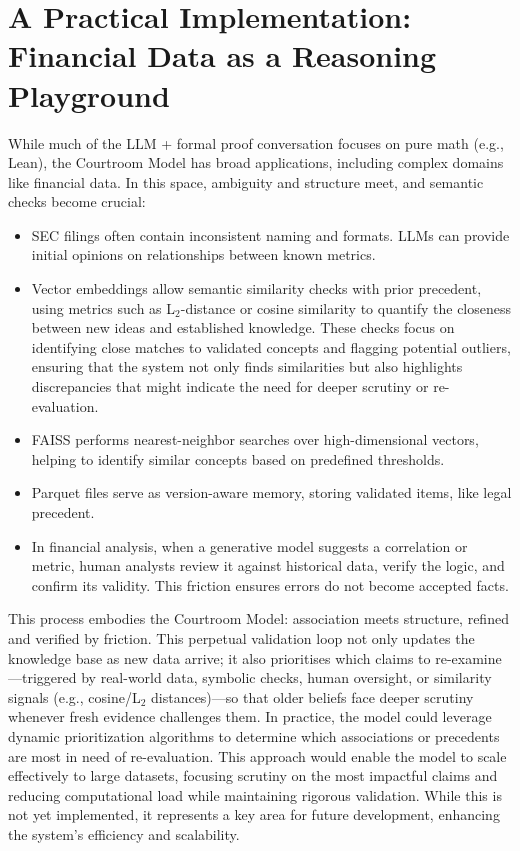 \documentclass[11pt]{article}
\begin{document}
\section{A Practical Implementation: Financial Data as a Reasoning Playground}
While much of the LLM + formal proof conversation focuses on pure math (e.g., Lean), the Courtroom Model has broad applications, including complex domains like financial data. In this space, ambiguity and structure meet, and semantic checks become crucial:
\begin{itemize}
    \item SEC filings often contain inconsistent naming and formats. LLMs can provide initial opinions on relationships between known metrics.
    \item Vector embeddings allow semantic similarity checks with prior precedent, using metrics such as L$_2$-distance or cosine similarity to quantify the closeness between new ideas and established knowledge. These checks focus on identifying close matches to validated concepts and flagging potential outliers, ensuring that the system not only finds similarities but also highlights discrepancies that might indicate the need for deeper scrutiny or re-evaluation.
    \item FAISS performs nearest-neighbor searches over high-dimensional vectors, helping to identify similar concepts based on predefined thresholds.
    \item Parquet files serve as version-aware memory, storing validated items, like legal precedent.
    \item In financial analysis, when a generative model suggests a correlation or metric, human analysts review it against historical data, verify the logic, and confirm its validity. This friction ensures errors do not become accepted facts.
\end{itemize}
This process embodies the Courtroom Model: association meets structure, refined and verified by friction. This perpetual validation loop not only updates the knowledge base as new data arrive; it also prioritises which claims to re-examine—triggered by real-world data, symbolic checks, human oversight, or similarity signals (e.g., cosine/L$_2$ distances)—so that older beliefs face deeper scrutiny whenever fresh evidence challenges them.
In practice, the model could leverage dynamic prioritization algorithms to determine which associations or precedents are most in need of re-evaluation. This approach would enable the model to scale effectively to large datasets, focusing scrutiny on the most impactful claims and reducing computational load while maintaining rigorous validation. While this is not yet implemented, it represents a key area for future development, enhancing the system's efficiency and scalability.
\end{document}
